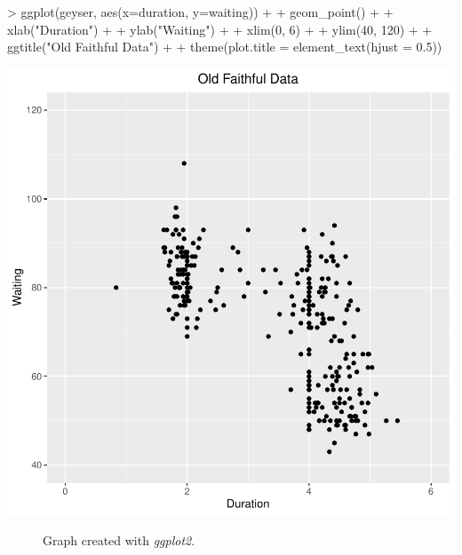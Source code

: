 \documentclass[12pt,letterpaper,final]{article}
\begin{document}
\begin{enumerate}
\begin{enumerate}
\begin{Schunk}
\begin{Sinput}
> ggplot(geyser, aes(x=duration, y=waiting)) +
+   geom_point() +
+   xlab("Duration") +
+   ylab("Waiting") +
+   xlim(0, 6) +
+   ylim(40, 120) +
+   ggtitle("Old Faithful Data") +
+   theme(plot.title = element_text(hjust = 0.5))
\end{Sinput}
\end{Schunk}
\includegraphics{rnw_template-006}


\begin{figure}[ht]
\caption{\label{hw01_q2b}
Graph created with {\it ggplot2}.
}
\end{figure}



\end{enumerate}
\end{enumerate}
\end{document}
